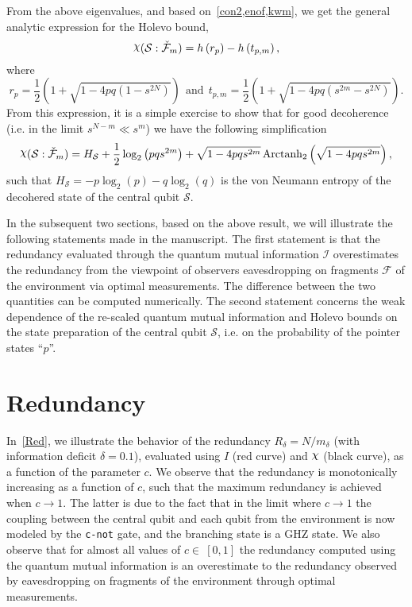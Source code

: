 \documentclass[aps,prl,showpacs,amsmath,amssymb,amsfonts,lengthcheck,onecolumn,longbibliography,superscriptaddress]{revtex4-2}
\newcommand{\cS}        {{\mathcal S}}
\newcommand{\cI}        {{\mathcal I}}
\newcommand{\+}         {\dagger}
\newcommand\cF{{\mathcal F}}
\newcommand{\ba}{\begin{eqnarray}}
\newcommand{\ea}{\end{eqnarray}}
\DeclareRobustCommand{\rchi}{{\mathpalette\irchi\relax}}
\newcommand{\irchi}[2]{\raisebox{\depth}{$#1\chi$}}
\newcommand{\mc}[1]{\mathcal{#1}}
\begin{document}
From the above eigenvalues, and based on~\cref{con2,enof,kwm}, we get the general analytic expression for the Holevo bound,
\begin{equation}
	\rchi(\mc{S}:\check{\mc{F}}_m)= h\left(r_p\right)-h\left(t_{p,m}\right),
	\label{chi1}
\end{equation}
where
\begin{equation}
	r_p= \frac{1}{2}\left(1+\sqrt{1-4pq\left(1-s^{2N}\right)}\right) \ \ \text{and} \ \ t_{p,m}=\frac{1}{2}\left(1+\sqrt{1-4pq\left(s^{2m}-s^{2N}\right)}\right).
\end{equation}
From this expression, it is a simple exercise to show that for good decoherence (i.e. in the limit $s^{N-m} \ll  s^m$) we have the following simplification
\ba
\rchi(\mc{S}:\check \cF_m)= H_\cS +\frac 1 2 \log_{2}\left(pqs^{2m}\right) +\sqrt{1-4pqs^{2m}}\operatorname{Arctanh}_2\left(\sqrt{1-4pqs^{2m}}\right),
\ea
such that $H_{\mc{S}}=-p \log_2(p)-q \log_2(q)$ is the von Neumann entropy of the decohered state of the central qubit $\mc{S}$.

In the subsequent two sections, based on the above result, we will illustrate the following statements made in the manuscript. The first statement is that the redundancy evaluated through the quantum mutual information $\cI$ overestimates the redundancy from the viewpoint of observers eavesdropping on fragments $\cF$ of the environment via optimal measurements. The difference between the two quantities can be computed numerically. The second statement concerns the weak dependence of the re-scaled quantum mutual information and Holevo bounds on the state preparation of the central qubit $\cS$, i.e. on the probability of the pointer states ``$p$''.
 
\section{Redundancy}

In~\cref{Red}, we illustrate the behavior of the redundancy $R_{\delta}=N/m_{\delta}$ (with information deficit $\delta=0.1$), evaluated using $I$ (red curve) and $\rchi$ (black curve), as a function of the parameter $c$. We observe that the redundancy is monotonically increasing as a function of $c$, such that the maximum redundancy is achieved when $c \rightarrow 1$. The latter is due to the fact that in the limit where $c \rightarrow 1$ the coupling between the central qubit and each qubit from the environment is now modeled by the {\tt c-not} gate, and the branching state is a GHZ state. We also observe that for almost all values of $c \in \ [0,1]$ the redundancy computed using the quantum mutual information is an overestimate to the redundancy observed by eavesdropping on fragments of the environment through optimal measurements.
\end{document}
